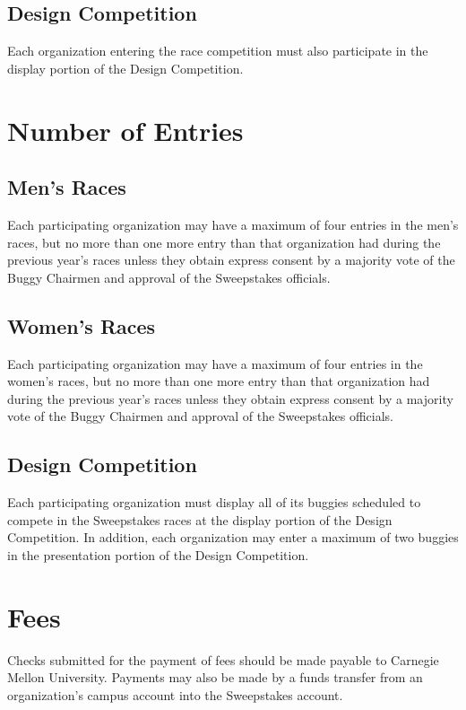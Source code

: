 \subsection{Design Competition}

	Each organization entering the race competition must also participate in the display portion of the Design Competition.

\section{Number of Entries}

\subsection{Men's Races}

	Each participating organization may have a maximum of four entries in the men's races, but no more than one more entry than that organization had during the previous year's races unless they obtain express consent by a majority vote of the Buggy Chairmen and approval of the Sweepstakes officials.

\subsection{Women's Races}

	Each participating organization may have a maximum of four entries in the women's races, but no more than one more entry than that organization had during the previous year's races unless they obtain express consent by a majority vote of the Buggy Chairmen and approval of the Sweepstakes officials.

\subsection{Design Competition}

	Each participating organization must display all of its buggies scheduled to compete in the Sweepstakes races at the display portion of the Design Competition. In addition, each organization may enter a maximum of two buggies in the presentation portion of the Design Competition.

\section{Fees}

	Checks submitted for the payment of fees should be made payable to Carnegie Mellon University. Payments may also be made by a funds transfer from an organization's campus account into the Sweepstakes account. 

